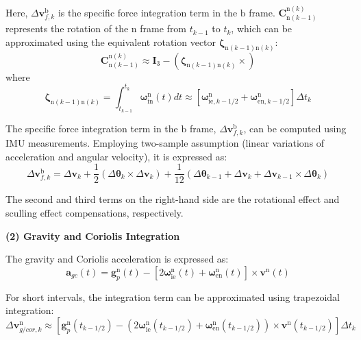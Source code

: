 \documentclass{article}
\begin{document}
Here, $\Delta \boldsymbol{v}_{f,k}^{\mathrm{b}}$ is the specific force integration term in the $\mathrm{b}$ frame. $\mathbf{C}_{\mathrm{n}(k-1)}^{\mathrm{n}(k)}$ represents the rotation of the $\mathrm{n}$ frame from $t_{k-1}$ to $t_k$, which can be approximated using the equivalent rotation vector $\boldsymbol{\zeta}_{\mathrm{n}(k-1)\mathrm{n}(k)}$:
\begin{equation}
    \mathbf{C}_{\mathrm{n}(k-1)}^{\mathrm{n}(k)} \approx \boldsymbol{I}_{3} - \left(\boldsymbol{\zeta}_{\mathrm{n}(k-1)\mathrm{n}(k)} \times \right)
\end{equation}
where
\begin{equation}
    \boldsymbol{\zeta}_{\mathrm{n}(k-1)\mathrm{n}(k)} = \int_{t_{k-1}}^{t_k} \boldsymbol{\omega}_{\mathrm{in}}^{\mathrm{n}}(t) dt \approx \left[ \boldsymbol{\omega}_{\mathrm{ie},k-1/2}^{\mathrm{n}} + \boldsymbol{\omega}_{\mathrm{en},k-1/2}^{\mathrm{n}} \right] \Delta t_k
    \label{eq:n-frame-rotation-vector}
\end{equation}

The specific force integration term in the $\mathrm{b}$ frame, $\Delta \boldsymbol{v}_{f,k}^{\mathrm{b}}$, can be computed using IMU measurements. Employing two-sample assumption (linear variations of acceleration and angular velocity), it is expressed as:
\begin{equation}
    \Delta \boldsymbol{v}_{f,k}^{\mathrm{b}} = \Delta \boldsymbol{v}_{k} + \frac{1}{2}\left( \Delta \boldsymbol{\theta}_{k} \times \Delta \boldsymbol{v}_{k} \right) + \frac{1}{12} \left( \Delta \boldsymbol{\theta}_{k-1} + \Delta \boldsymbol{v}_{k} + \Delta \boldsymbol{v}_{k-1} \times \Delta \boldsymbol{\theta}_{k} \right)
    \label{eq:b-frame-velocity-integration}
\end{equation}

The second and third terms on the right-hand side are the rotational effect and sculling effect compensations, respectively.

\textbf{(2) Gravity and Coriolis Integration}

The gravity and Coriolis acceleration is expressed as:
\begin{equation}
    \boldsymbol{a}_{gc} (t) = \boldsymbol{g}_{p}^{\mathrm{n}}(t) - \left[ 2 \boldsymbol{\omega}_{\mathrm{ie}}^{\mathrm{n}} (t) + \boldsymbol{\omega}_{\mathrm{en}}^{\mathrm{n}}(t) \right] \times \boldsymbol{v}^{\mathrm{n}}(t)
\end{equation}

For short intervals, the integration term can be approximated using trapezoidal integration:
\begin{equation}
    \Delta \boldsymbol{v}_{g/cor,k}^{\mathrm{n}} \approx \left[ \boldsymbol{g}_{p}^{\mathrm{n}}(t_{k-1/2}) - \left( 2 \boldsymbol{\omega}_{\mathrm{ie}}^{\mathrm{n}} (t_{k-1/2}) + \boldsymbol{\omega}_{\mathrm{en}}^{\mathrm{n}}(t_{k-1/2}) \right) \times \boldsymbol{v}^{\mathrm{n}}(t_{k-1/2}) \right] \Delta t_k
    \label{eq:n-frame-gravity-cor-acceleration}
\end{equation}
\end{document}
